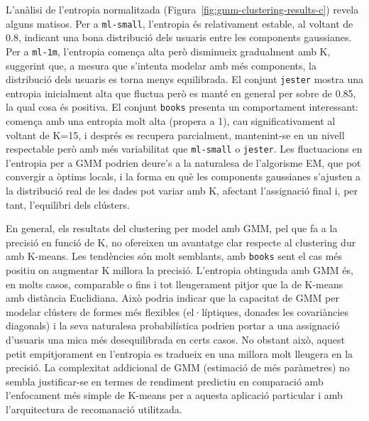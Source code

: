 \documentclass[a4paper,12pt]{report}
\begin{document}
L'anàlisi de l'entropia normalitzada (Figura~\ref{fig:gmm-clustering-results-c}) revela alguns matisos. Per a \texttt{ml-small}, l'entropia és relativament estable, al voltant de 0.8, indicant una bona distribució dels usuaris entre les components gaussianes. Per a \texttt{ml-1m}, l'entropia comença alta però disminueix gradualment amb K, suggerint que, a mesura que s'intenta modelar amb més components, la distribució dels usuaris es torna menys equilibrada. El conjunt \texttt{jester} mostra una entropia inicialment alta que fluctua però es manté en general per sobre de 0.85, la qual cosa és positiva. El conjunt \texttt{books} presenta un comportament interessant: comença amb una entropia molt alta (propera a 1), cau significativament al voltant de K=15, i després es recupera parcialment, mantenint-se en un nivell respectable però amb més variabilitat que \texttt{ml-small} o \texttt{jester}. Les fluctuacions en l'entropia per a GMM podrien deure's a la naturalesa de l'algorisme EM, que pot convergir a òptims locals, i la forma en què les components gaussianes s'ajusten a la distribució real de les dades pot variar amb K, afectant l'assignació final i, per tant, l'equilibri dels clústers.

En general, els resultats del clustering per model amb GMM, pel que fa a la precisió en funció de K, no ofereixen un avantatge clar respecte al clustering dur amb K-means. Les tendències són molt semblants, amb \texttt{books} sent el cas més positiu on augmentar K millora la precisió. L'entropia obtinguda amb GMM és, en molts casos, comparable o fins i tot lleugerament pitjor que la de K-means amb distància Euclidiana. Això podria indicar que la capacitat de GMM per modelar clústers de formes més flexibles (el·líptiques, donades les covariàncies diagonals) i la seva naturalesa probabilística podrien portar a una assignació d'usuaris una mica més desequilibrada en certs casos. No obstant això, aquest petit empitjorament en l'entropia es tradueix en una millora molt lleugera en la precisió. La complexitat addicional de GMM (estimació de més paràmetres) no sembla justificar-se en termes de rendiment predictiu en comparació amb l'enfocament més simple de K-means per a aquesta aplicació particular i amb l'arquitectura de recomanació utilitzada.
\end{document}
